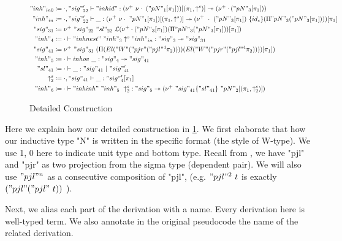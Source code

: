 \begin{figure}
  \begin{minipage}{0.8\linewidth}
    \small
    \centering
    \begin{align*}
      "inh"_{in0} &\coloneqq \goodInh{\cdot, "sig"_{22}'}{"inhid"}{(\nu^+ \ \nu\cdot \ ("pN"_1[\pi_1]))[(\pi_1, \uparrow^s)]}{(\nu^+ \cdot ("pN"_3[\pi_1]))} \\
      "inh"_{in} &\coloneqq \goodInh{\cdot , "sig"_{22}'}{\_}{(\nu^+ \ \nu\cdot \ "pN"_1[\pi_1])[(\pi_1, \uparrow^s)]}{(\nu^+ \ \cdot \ ("pN"_3[\pi_1]) \ \{id_s\} (\Pi "pN"_3 ("pN"_3[\pi_1])) )[\pi_1]}\\
      "sig"_{31} &\coloneqq  \nu^+ \ "sig"_{22} \ {"sl"_{22}}\  \cL(\nu^+ \cdot ("pN"_3[\pi_1])  (\Pi "pN"_3 ("pN"_3[\pi_1]))[\pi_1]) \\ 
      "inh"_4 &\coloneqq \goodInh{\cdot}{"inhnest" \ "inh"_3 \uparrow^s "inh"_{in}}{"sig"_3}{"sig"_{31}} \\
      "sig"_{41} &\coloneqq {\nu^+ \ "sig"_{31} \ (\Pi (El ("W" ("pjr" ("pjl"^4 \pi_2)))) (El ("W" ("pjr" ("pjl"^4 \pi_2))))[\pi_1])} \\ 
      "inh"_5 &\coloneqq \goodInh{\cdot}{inhov \ \_}{"sig"_4}{"sig"_{41}} \\ 
      "sl"_{41} &\coloneqq \goodSeal{\cdot}{\_}{"sig"_{41}}{"sig"_{41}'} \\ 
      \uparrow^s_2 &\coloneqq \goodTerm{\cdot, "sig"_{41}}{\_}{"sig"_4'[\pi_1]} \\ 
      "inh"_6 &\coloneqq \goodInh{\cdot}{"inhinh" \ "inh"_5 \ \uparrow^s_2}{"sig"_5}{(\nu^+ \ "sig"_{41} \{"sl"_{41}\} \ "pN"_2[(\pi_1, \uparrow^s_2)])}
    \end{align*}  
  \end{minipage}
  \caption{Detailed Construction}\label{fig:example-construction}
\end{figure}





Here we explain how  our detailed construction in
\cref{fig:example-construction}. We first elaborate that
how our inductive type "N" is written in the specific format (the style
of W-type). We use 1, 0 here to indicate unit type and bottom type. Recall from , we have "pjl" and "pjr" as two projection from the sigma type (dependent pair). We will also use $"pjl"^n$ as a consecutive composition of "pjl", (e.g. $"pjl"^2~t$ is exactly $("pjl" ("pjl"~t))$ ).

Next, we alias each part of the derivation with a name. Every derivation
here is well-typed term. We also annotate in the original pseudocode the
name of the related derivation. 

